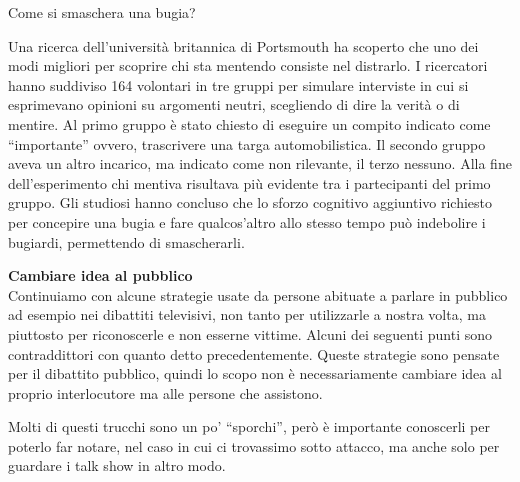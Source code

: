 \documentclass[12pt]{book} %
\begin{document}
\bigskip
\begin{mdframed}[linewidth=1pt]
Come si smaschera una bugia?

Una ricerca dell'università britannica di Portsmouth ha scoperto che uno dei modi migliori per scoprire chi sta mentendo
consiste nel distrarlo. I ricercatori hanno suddiviso 164 volontari in tre gruppi per simulare interviste in cui si
esprimevano opinioni su argomenti neutri, scegliendo di dire la verità o di mentire. Al primo gruppo è stato chiesto di
eseguire un compito indicato come “importante” ovvero, trascrivere una targa automobilistica. Il secondo gruppo aveva
un altro incarico, ma indicato come non rilevante, il terzo nessuno. Alla fine dell'esperimento
chi mentiva risultava più evidente tra i partecipanti del primo gruppo. Gli studiosi hanno concluso che lo sforzo
cognitivo aggiuntivo richiesto per concepire una bugia e fare qualcos'altro allo stesso tempo può indebolire i
bugiardi, permettendo di smascherarli.
\end{mdframed}

\noindent \textbf{\large Cambiare idea al pubblico} \\
Continuiamo con alcune strategie usate da persone abituate a parlare in pubblico ad esempio nei dibattiti televisivi,
non tanto per utilizzarle a nostra volta, ma piuttosto per riconoscerle e non esserne vittime. Alcuni dei seguenti
punti sono contraddittori con quanto detto precedentemente. Queste strategie sono pensate per il dibattito pubblico,
quindi lo scopo non è necessariamente cambiare idea al proprio interlocutore ma alle persone che assistono. 

Molti di questi trucchi sono un po' “sporchi”, però è importante conoscerli per poterlo far notare, nel
caso in cui ci trovassimo sotto attacco, ma anche solo per guardare i talk show in altro modo.
\end{document}
